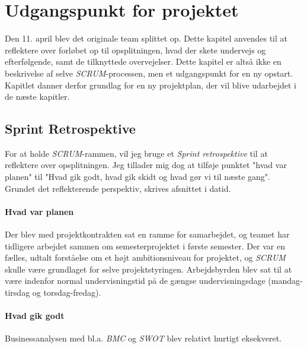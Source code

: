 \chapter{Udgangspunkt for projektet}
\label{chapter:udgangspunkt}

Den 11. april blev det originale team splittet op. Dette kapitel anvendes til at reflektere over forløbet op til opsplitningen, hvad der skete undervejs og efterfølgende, samt de tilknyttede overvejelser.
Dette kapitel er altså ikke en beskrivelse af selve \emph{SCRUM}-processen, men et udgangspunkt for en ny opstart. Kapitlet danner derfor grundlag for en ny projektplan, der vil blive udarbejdet i de næste kapitler.

\section{Sprint Retrospektive}
For at holde \emph{SCRUM}-rammen, vil jeg bruge et \emph{Sprint retrospektive} til at reflektere over opsplitningen.
Jeg tillader mig dog at tilføje punktet "hvad var planen" til "Hvad gik godt, hvad gik skidt og hvad gør vi til næste gang". Grundet det reflekterende perspektiv, skrives afsnittet i datid.

\subsubsection{Hvad var planen}
Der blev med projektkontrakten sat en ramme for samarbejdet, og teamet har tidligere arbejdet sammen om semesterprojektet i første semester.
Der var en fælles, udtalt forståelse om et højt ambitionsniveau for projektet, og \emph{SCRUM} skulle være grundlaget for selve projektstyringen.
Arbejdsbyrden blev sat til at være indenfor normal undervisningstid på de gængse undervisningsdage (mandag-tirsdag og torsdag-fredag).

\subsubsection{Hvad gik godt}
Businessanalysen med bl.a. \emph{BMC} og \emph{SWOT} blev relativt hurtigt eksekveret.


